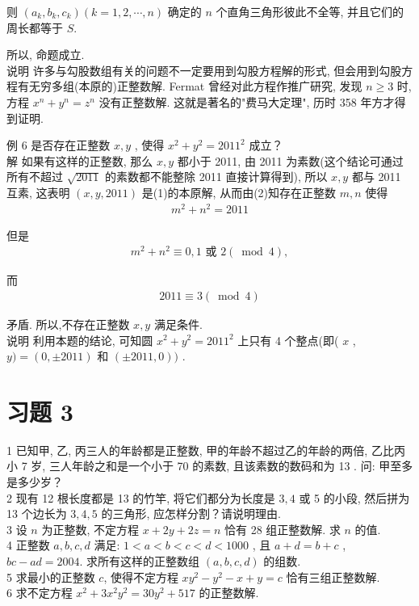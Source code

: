 	则 $\left(a_{k}, b_{k}, c_{k}\right)(k=1,2, \cdots, n)$ 确定的 $n$ 个直角三角形彼此不全等, 并且它们的周长都等于 $S$.

	所以, 命题成立. \\
	说明 许多与勾股数组有关的问题不一定要用到勾股方程解的形式, 但会用到勾股方程有无穷多组(本原的)正整数解.  Fermat 曾经对此方程作推广研究, 发现 $n \geqslant 3$ 时, 方程 $x^{n}+y^{n}=z^{n}$ 没有正整数解. 这就是著名的"费马大定理", 历时 358 年方才得到证明.

	例 6 是否存在正整数 $x ,  y$ , 使得 $x^{2}+y^{2}=2011^{2}$ 成立？\\
	解 如果有这样的正整数, 那么 $x ,  y$ 都小于 2011, 由 2011 为素数(这个结论可通过所有不超过 $\sqrt{2011}$ 的素数都不能整除 2011 直接计算得到), 所以 $x ,  y$ 都与 2011 互素, 这表明 $(x, y, 2011)$ 是(1)的本原解, 从而由(2)知存在正整数 $m ,  n$ 使得
\begin{align*}
		m^{2}+n^{2}=2011
	\end{align*}

	但是
\begin{align*}
		m^{2}+n^{2} \equiv 0 ,  1 \text { 或 } 2(\bmod 4),
	\end{align*}

	而
\begin{align*}
		2011 \equiv 3(\bmod 4)
	\end{align*}

	矛盾. 所以,不存在正整数 $x ,  y$ 满足条件.\\
	说明 利用本题的结论, 可知圆 $x^{2}+y^{2}=2011^{2}$ 上只有 4 个整点(即( $x$ ,  $y)=(0, \pm 2011)$ 和 $( \pm 2011,0))$ .

	\section{习题 3}
	1 已知甲, 乙, 丙三人的年龄都是正整数, 甲的年龄不超过乙的年龄的两倍, 乙比丙小 7 岁, 三人年龄之和是一个小于 70 的素数, 且该素数的数码和为 13 . 问: 甲至多是多少岁？\\
	2 现有 12 根长度都是 13 的竹竿, 将它们都分为长度是 $3 ,  4$ 或 5 的小段, 然后拼为 13 个边长为 $3 ,  4 ,  5$ 的三角形, 应怎样分割？请说明理由. \\
	3 设 $n$ 为正整数, 不定方程 $x+2 y+2 z=n$ 恰有 28 组正整数解. 求 $n$ 的值.\\
	4 正整数 $a ,  b ,  c ,  d$ 满足: $1<a<b<c<d<1000$ , 且 $a+d=b+c$ ,  $b c-a d=2004$. 求所有这样的正整数组 $(a, b, c, d)$ 的组数.\\
	5 求最小的正整数 $c$, 使得不定方程 $x y^{2}-y^{2}-x+y=c$ 恰有三组正整数解. \\
	6 求不定方程 $x^{2}+3 x^{2} y^{2}=30 y^{2}+517$ 的正整数解.

